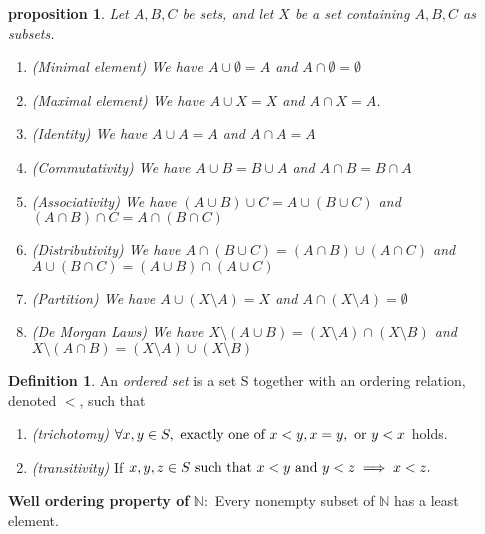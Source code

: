 \documentclass{article}
\newtheorem{proposition}{Proposition}[section]
\newtheorem{proposition}{proposition}[section]
\theoremstyle{definition}
\newtheorem{definition}{Definition}[section]
\theoremstyle{remark}
\begin{document}
\begin{proposition}\label{prp:set_operations}
Let $A, B, C$ be sets, and let $X$ be a set containing $A, B, C$ as subsets. 
\begin{enumerate}
\item (Minimal element) We have $ A \cup \emptyset = A$ and $A \cap \emptyset = \emptyset$
\item (Maximal element) We have $ A \cup X = X$ and $ A \cap X = A$.
\item (Identity) We have $ A \cup A = A$ and $ A \cap A = A$
\item (Commutativity) We have $ A \cup B = B \cup A$ and $ A \cap B = B \cap A$
\item (Associativity) We have $ (A \cup B) \cup C = A \cup (B\cup C)$ and $ (A\cap B) \cap C = A \cap (B \cap C)$
\item (Distributivity) We have $ A \cap (B\cup C) = (A \cap B) \cup (A\cap C) $ and $ A \cup (B \cap C) = (A \cup B) \cap (A\cup C)$
\item (Partition) We have $ A \cup (X \setminus A) = X$ and $ A \cap (X \setminus A) = \emptyset$
\item (De Morgan Laws) We have $ X \setminus (A \cup B) = (X \setminus A) \cap (X \setminus B)$ and $ X \setminus (A \cap B) = (X \setminus A) \cup (X \setminus B)$
\end{enumerate}
\end{proposition}





\begin{definition}\label{def:ordered set}
An \textit{ordered set} is a set S together with an ordering relation, denoted \(<\), such that
\begin{enumerate}
\item \textit{(trichotomy)} \(\forall x,y \in S, \textnormal{ exactly one of } x < y, x=y, \textnormal{ or } y<x\) holds.
\item \textit{(transitivity)} If \(x,y,z \in S \textnormal{ such that } x < y \textnormal{ and } y < z \implies x < z.\)
\end{enumerate}
\textbf{Well ordering property of }\label{def:WOA}\(\mathbb{N}:\) Every nonempty subset of \(\mathbb{N}\) has a least element.
\end{definition}
\end{document}
